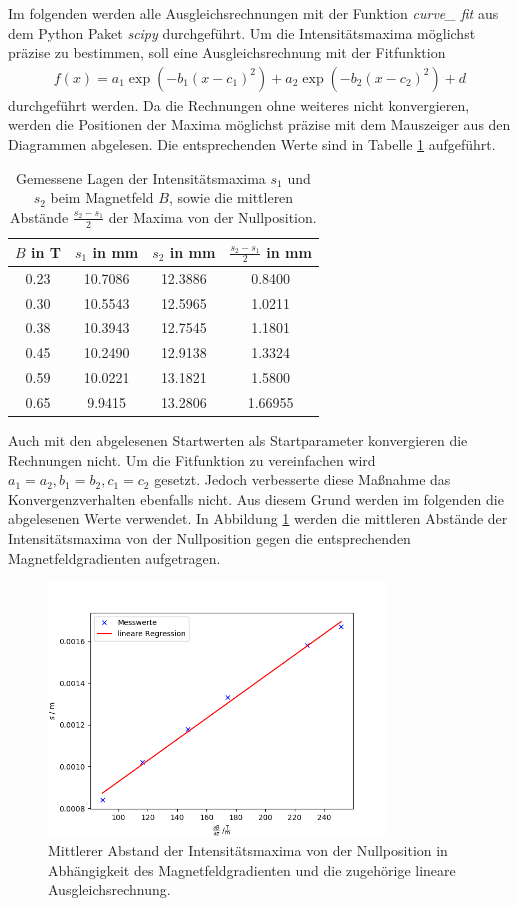 Im folgenden werden alle Ausgleichsrechnungen mit der Funktion \textit{curve\_ fit} aus dem Python Paket \textit{scipy} durchgeführt.
Um die Intensitätsmaxima möglichst präzise zu bestimmen, soll eine Ausgleichsrechnung mit der Fitfunktion
\begin{align*}
f(x)=a_1\exp(-b_1(x-c_1)^2) + a_2\exp(-b_2(x-c_2)^2) + d
\end{align*}
durchgeführt werden.
Da die Rechnungen ohne weiteres nicht konvergieren, werden die Positionen der Maxima möglichst präzise mit dem Mauszeiger aus den Diagrammen abgelesen.
Die entsprechenden Werte sind in Tabelle \ref{tab:a:1} aufgeführt.
\begin{table}
\centering
\caption{Gemessene Lagen der Intensitätsmaxima $s_1$ und $s_2$ beim Magnetfeld $B$, sowie die mittleren Abstände $\frac{s_2 - s_1}{2}$ der Maxima von der Nullposition.}
\label{tab:a:1}
\begin{tabular}{c c c c}
\hline
$B$ in T & $s_1$ in mm & $s_2$ in mm & $\frac{s_2 - s_1}{2}$ in mm\\ \hline
0.23 &10.7086  &12.3886  &0.8400  \\
0.30 &10.5543  &12.5965  &1.0211   \\
0.38 &10.3943  &12.7545  &1.1801   \\
0.45 &10.2490 &12.9138  &1.3324   \\
0.59 &10.0221  &13.1821  &1.5800  \\
0.65 &9.9415  &13.2806  &1.66955 \\
\hline
\end{tabular}
\end{table}
Auch mit den abgelesenen Startwerten als Startparameter konvergieren die Rechnungen nicht.
Um die Fitfunktion zu vereinfachen wird $a_1=a_2, b_1=b_2,c_1=c_2$ gesetzt.
Jedoch verbesserte diese Maßnahme das Konvergenzverhalten ebenfalls nicht.
Aus diesem Grund werden im folgenden die abgelesenen Werte verwendet.
In Abbildung \ref{fig:a:8} werden die mittleren Abstände der Intensitätsmaxima von der Nullposition gegen die entsprechenden Magnetfeldgradienten aufgetragen. 
\begin{figure}
\centering
\includegraphics[width=0.8\textwidth]{python/plots/plot_8.png}
\caption{Mittlerer Abstand der Intensitätsmaxima von der Nullposition in Abhängigkeit des Magnetfeldgradienten und die zugehörige lineare Ausgleichsrechnung.}
\label{fig:a:8}
\end{figure}
